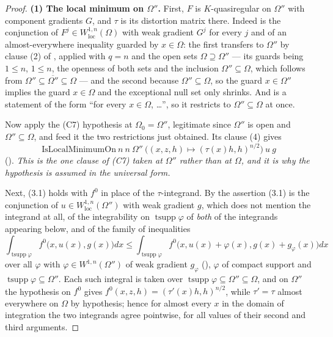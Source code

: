 \begin{proof}
\textbf{(1) The local minimum on $\Omega''$.}  First, $F$ is $K$-quasiregular on
$\Omega''$ with component gradients $G$, and $\tau$ is its distortion matrix
there.  Indeed  is the conjunction of
$F^j\in W^{1,n}_{\mathrm{loc}}(\Omega)$ with weak gradient $G^j$ for every $j$
and of an almost-everywhere inequality guarded by $x\in\Omega$: the first
transfers to $\Omega''$ by clause (2) of , applied
with $q=n$ and the open sets $\Omega\supseteq\Omega''$ --- its guards being
$1\le n$, $1\le n$, the openness of both sets and the inclusion
$\Omega''\subseteq\Omega$, which follows from
$\Omega''\subseteq\overline{\Omega''}\subseteq\Omega$ --- and the second because
$\Omega''\subseteq\Omega$, so the guard $x\in\Omega''$ implies the guard
$x\in\Omega$ and the exceptional null set only shrinks.  And
 is a statement of the form ``for every
$x\in\Omega$, \dots'', so it restricts to $\Omega''\subseteq\Omega$ at once.

Now apply the (C7) hypothesis at $\Omega_0=\Omega''$, legitimate since
$\Omega''$ is open and $\Omega''\subseteq\Omega$, and feed it the two
restrictions just obtained.  Its clause (4) gives
\[
\mathrm{IsLocalMinimumOn}\ n\ n\ \Omega''\
\bigl(\textstyle(x,z,h)\mapsto(\tau(x)h,h)^{n/2}\bigr)\ u\ g
\tag{3.1}
\]
().  \emph{This is the one clause of \textup{(C7)}
taken at $\Omega''$ rather than at $\Omega$, and it is why the hypothesis is
assumed in the universal form.}

Next, (3.1) holds with $f^0$ in place of the $\tau$-integrand.  By
\noderef{IsLocalMinimumOn} the assertion (3.1) is the conjunction of
$u\in W^{1,n}_{\mathrm{loc}}(\Omega'')$ with weak gradient $g$, which does not
mention the integrand at all, of the integrability on
$\operatorname{tsupp}\varphi$ of \emph{both} of the integrands appearing below,
and of the family of inequalities
\[
\int_{\operatorname{tsupp}\varphi}f^0\bigl(x,u(x),g(x)\bigr)dx
\le\int_{\operatorname{tsupp}\varphi}
f^0\bigl(x,u(x)+\varphi(x),g(x)+g_\varphi(x)\bigr)dx
\]
over all $\varphi$ with $\varphi\in W^{1,n}(\Omega'')$ of weak gradient
$g_\varphi$ (\noderef{MemW1pOn}), $\varphi$ of compact support and
$\operatorname{tsupp}\varphi\subseteq\Omega''$.  Each such integral is taken
over $\operatorname{tsupp}\varphi\subseteq\Omega''\subseteq\Omega$, and on
$\Omega''$ the hypothesis on $f^0$ gives
$f^0(x,z,h)=(\tau'(x)h,h)^{n/2}$, while $\tau'=\tau$ almost everywhere on
$\Omega$ by hypothesis; hence for almost every $x$ in the domain of integration
the two integrands agree pointwise, for all values of their second and third
arguments.


\end{proof}
